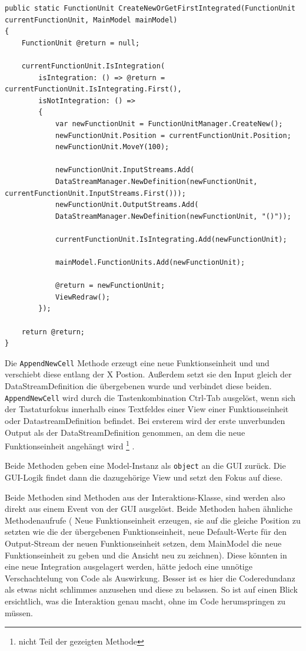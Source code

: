 \begin{lstlisting}[caption=CreateNewOrGetFirstIntegrated]
public static FunctionUnit CreateNewOrGetFirstIntegrated(FunctionUnit currentFunctionUnit, MainModel mainModel)
{
	FunctionUnit @return = null;
	
	currentFunctionUnit.IsIntegration(
		isIntegration: () => @return = 		currentFunctionUnit.IsIntegrating.First(),
		isNotIntegration: () =>
		{
			var newFunctionUnit = FunctionUnitManager.CreateNew();
			newFunctionUnit.Position = currentFunctionUnit.Position;
			newFunctionUnit.MoveY(100);
			
			newFunctionUnit.InputStreams.Add(
			DataStreamManager.NewDefinition(newFunctionUnit, currentFunctionUnit.InputStreams.First()));
			newFunctionUnit.OutputStreams.Add(
			DataStreamManager.NewDefinition(newFunctionUnit, "()"));
			
			currentFunctionUnit.IsIntegrating.Add(newFunctionUnit);
			
			mainModel.FunctionUnits.Add(newFunctionUnit);
			
			@return = newFunctionUnit;
			ViewRedraw();
		});
	
	return @return;
}
	\end{lstlisting}





	Die \texttt{AppendNewCell} Methode erzeugt eine neue Funktionseinheit und und
	verschiebt diese entlang der X Postion.
	Außerdem setzt sie den Input gleich der DataStreamDefinition die
	übergebenen wurde und verbindet diese beiden.
	\texttt{AppendNewCell} wird durch die Tastenkombination Ctrl-Tab ausgelöst, wenn
	sich der Tastaturfokus innerhalb eines Textfeldes einer View einer Funktionseinheit oder
	DatastreamDefinition befindet. Bei ersterem wird der erste unverbunden Output als der
	DataStreamDefinition genommen, an dem die neue Funktionseinheit angehängt wird \footnote{nicht Teil der gezeigten Methode} .
	
	Beide Methoden geben eine
	Model-Instanz als \texttt{object} an die GUI zurück. Die GUI-Logik findet dann die
	dazugehörige View und setzt den Fokus auf diese.
	
	Beide Methoden sind Methoden aus der Interaktions-Klasse, sind werden also
	direkt aus einem Event von der GUI ausgelöst. 
	Beide Methoden haben ähnliche Methodenaufrufe ( Neue Funktionseinheit
	erzeugen, sie auf die gleiche Position zu setzten wie die der übergebenen
	Funktionseinheit, neue Default-Werte für den Output-Stream der neuen
	Funktionseinheit setzen, dem MainModel die neue Funktionseinheit zu geben
	und die Ansicht neu zu zeichnen). Diese könnten in eine neue
	Integration ausgelagert werden, hätte jedoch eine unnötige
	Verschachtelung von Code als Auswirkung. Besser ist es hier die
	Coderedundanz als etwas nicht schlimmes anzusehen und diese zu belassen.
	So ist auf einen Blick ersichtlich, was die Interaktion genau macht, ohne
	im Code herumspringen zu müssen.

